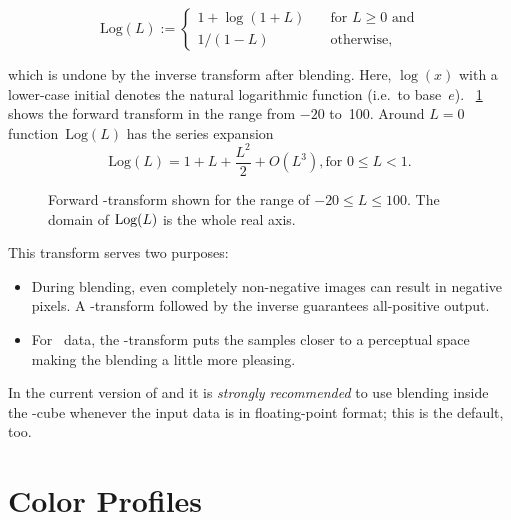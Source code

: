 \begin{equation}\label{equ:log-transform}
  \mbox{Log}(L) :=
  \left\{
  \begin{array}{ll}
    1 + \log(1 + L) & \quad \mbox{for } L \geq 0 \mbox{ and} \\
    1 / (1 - L)     & \quad \mbox{otherwise,}
  \end{array}
  \right.
\end{equation}

\noindent which is undone by the inverse transform after blending.  Here, $\log(x)$ with a
lower-case initial denotes the natural logarithmic function (i.e.\ to base~$e$).
\figureName~\ref{fig:log-transform} shows the forward transform in the range from $-20$ to~100.
Around $L = 0$ function~$\mbox{Log}(L)$ has the series expansion
\[
\mbox{Log}(L) = 1 + L + \frac{L^2}{2} + O(L^3), \mbox{for } 0 \leq L < 1.
\]

\begin{figure}
  \centering

  \caption[\LogTransform-transform]%
          {\label{fig:log-transform}%
            Forward \LogTransform-transform shown for the range of $-20 \leq L \leq 100$.  The
            domain of $\mbox{Log}(L)$ is the whole real axis.}
\end{figure}

This transform serves two purposes:

\begin{itemize}
\item
  During blending, even completely non-negative images can result in negative pixels.  A
  \LogTransform-transform followed by the inverse guarantees all-positive output.

\item
  For ~data, the \LogTransform-transform puts the samples closer to a perceptual
  space making the blending a little more pleasing.
\end{itemize}

In the current version of \App{} and \OtherApp{} it is \emph{strongly recommended} to use
blending inside the -cube whenever the input data is in floating-point format; this
is the default, too.


\section[Color Profiles]{\label{sec:color-profiles}%
  Color Profiles}

